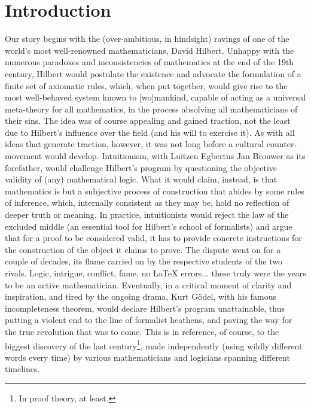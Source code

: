 \chapter{Introduction}
\label{chapter:Introduction}


Our story begins with the (over-ambitious, in hindsight) ravings of one of the world's most well-renowned mathematicians, David Hilbert. 
Unhappy with the numerous paradoxes and inconsistencies of mathematics at the end of the 19th century, Hilbert would postulate the existence and advocate the formulation of a finite set of axiomatic rules, which, when put together, would give rise to the most well-behaved system known to [wo]mankind, capable of acting as a universal meta-theory for all mathematics, in the process absolving all mathematicians of their sins.
The idea was of course appealing and gained traction, not the least due to Hilbert's influence over the field (and his will to exercise it).
As with all ideas that generate traction, however, it was not long before a cultural counter-movement would develop.
Intuitionism, with Luitzen Egbertus Jan Brouwer as its forefather, would challenge Hilbert's program by questioning the objective validity of (any) mathematical logic.
What it would claim, instead, is that mathematics is but a subjective process of construction that abides by some rules of inference, which, internally consistent as they may be, hold no reflection of deeper truth or meaning.
In practice, intuitionists would reject the law of the excluded middle (an essential tool for Hilbert's school of formalists) and argue that for a proof to be considered valid, it has to provide concrete instructions for the construction of the object it claims to prove.
The dispute went on for a couple of decades, its flame carried on by the respective students of the two rivals.
Logic, intrigue, conflict, fame, no \LaTeX{} errors...  these truly were the years to be an active mathematician.
Eventually, in a critical moment of clarity and inspiration, and tired by the ongoing drama, Kurt G\"odel, with his famous incompleteness theorem, would declare Hilbert's program unattainable, thus putting a violent end to the line of formalist heathens, and paving the way for the true revolution that was to come.
This is in reference, of course, to the biggest discovery of the last century\footnote{In proof theory, at least.}, made independently (using wildly different words every time) by various mathematicians and logicians spanning different timelines.
